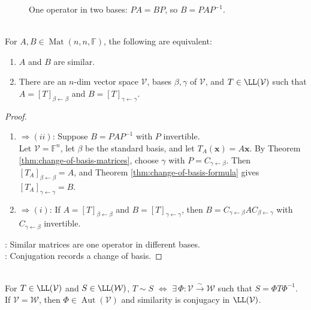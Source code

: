 \begin{figure}[H]
  \centering
  
  \caption{One operator in two bases: $PA=BP$, so $B=PAP^{-1}$.}
  \label{fig:similarity-change-of-basis-bridge}
\end{figure}

\begin{corollary} \label{cor:similar-iff-same-linear-operator} \\
For $A,B\in\operatorname{Mat}(n,n,\mathbb{F})$, the following are equivalent:
\begin{enumerate}[label=(\roman*)]
\setlength{\itemsep}{0pt}
\item $A$ and $B$ are similar.
\item There are an $n$-dim vector space $\mathcal{V}$, bases $\beta,\gamma$ of $\mathcal{V}$, and $T\in\LL(\mathcal{V})$ such that $A=[T]_{\beta \leftarrow \beta}$ and $B=[T]_{\gamma \leftarrow \gamma}$.
\end{enumerate}
\begin{proof}
\begin{enumerate}[label=(\roman)*.]
\setlength{\itemsep}{0pt}
\item[$(i)$] $\Rightarrow (ii)$: Suppose $B=PAP^{-1}$ with $P$ invertible.\\
Let $\mathcal{V}=\mathbb{F}^n$, let $\beta$ be the standard basis, and let $T_A(\mathbf{x})=A\mathbf{x}$. By Theorem \ref{thm:change-of-basis-matrices}, choose $\gamma$ with $P=C_{\gamma \leftarrow \beta}$. Then $[T_A]_{\beta \leftarrow \beta}=A$, and Theorem \ref{thm:change-of-basis-formula} gives $[T_A]_{\gamma \leftarrow \gamma}=B$.
\item[$(ii)$] $\Rightarrow (i)$: If $A=[T]_{\beta \leftarrow \beta}$ and $B=[T]_{\gamma \leftarrow \gamma}$, then $B=C_{\gamma \leftarrow \beta}AC_{\beta \leftarrow \gamma}$ with $C_{\gamma \leftarrow \beta}$ invertible.
\end{enumerate}
: Similar matrices are one operator in different bases.\\
: Conjugation records a change of basis.
\end{proof}
\end{corollary}

\begin{definition} \label{def:similar-linear-operators} \\
For $T\in\LL(\mathcal{V})$ and $S\in\LL(\mathcal{W})$, $T\sim S$ $\Longleftrightarrow$ $\exists\,\Phi:\mathcal{V}\xrightarrow{\sim}\mathcal{W}$ such that $ S=\Phi T\Phi^{-1}$.\\
If $\mathcal{V}=\mathcal{W}$, then $\Phi\in\operatorname{Aut}(\mathcal{V})$ and similarity is conjugacy in $\LL(\mathcal{V})$.
\end{definition}

